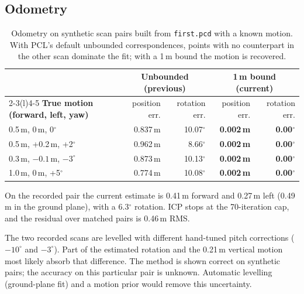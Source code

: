 \documentclass[10pt,a4paper]{scrartcl}
\newcommand{\code}[1]{\texttt{#1}}
\begin{document}
  \subsection{Odometry}
  \label{sec:odometry}

  \begin{table}[htbp]
  \small
  \centering
  \begin{tabular}{@{}lrrrr@{}}
  \toprule
  & \multicolumn{2}{c}{\textbf{Unbounded (previous)}} & \multicolumn{2}{c}{\textbf{1\,m bound (current)}} \\
  \cmidrule(lr){2-3}\cmidrule(l){4-5}
  \textbf{True motion (forward, left, yaw)} & position err. & rotation err. & position err. & rotation err. \\
  \midrule
  0.5\,m, 0\,m, 0$^\circ$     & 0.837\,m & 10.07$^\circ$ & \textbf{0.002\,m} & \textbf{0.00$^\circ$} \\
  0.5\,m, +0.2\,m, +2$^\circ$ & 0.962\,m &  8.66$^\circ$ & \textbf{0.002\,m} & \textbf{0.00$^\circ$} \\
  0.3\,m, $-0.1$\,m, $-3^\circ$ & 0.873\,m & 10.13$^\circ$ & \textbf{0.002\,m} & \textbf{0.00$^\circ$} \\
  1.0\,m, 0\,m, +5$^\circ$    & 0.774\,m & 10.08$^\circ$ & \textbf{0.002\,m} & \textbf{0.00$^\circ$} \\
  \bottomrule
  \end{tabular}
  \caption{Odometry on synthetic scan pairs built from \code{first.pcd} with a known motion.
  With PCL's default unbounded correspondences, points with no counterpart in the other scan
  dominate the fit; with a 1\,m bound the motion is recovered.}
  \label{tab:odo}
  \end{table}

  On the recorded pair the current estimate is 0.41\,m forward and 0.27\,m left (0.49\,m in the
  ground plane), with a 6.3$^\circ$ rotation. ICP stops at the 70-iteration cap, and the residual
  over matched pairs is 0.46\,m RMS.

  \begin{warnbox}
  \small
  The two recorded scans are levelled with different hand-tuned pitch corrections
  ($-10^\circ$ and $-3^\circ$). Part of the estimated rotation and the 0.21\,m vertical motion
  most likely absorb that difference. The method is shown correct on synthetic pairs; the
  accuracy on this particular pair is unknown. Automatic levelling (ground-plane fit) and a
  motion prior would remove this uncertainty.
  \end{warnbox}
\end{document}
